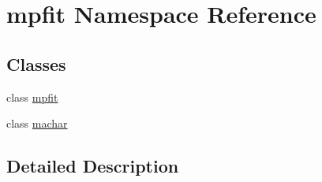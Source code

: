 \hypertarget{namespacempfit}{\section{mpfit Namespace Reference}
\label{namespacempfit}
}
\subsection*{Classes}
\begin{DoxyCompactItemize}
\item 
class \hyperlink{classmpfit_1_1mpfit}{mpfit}
\item 
class \hyperlink{classmpfit_1_1machar}{machar}
\end{DoxyCompactItemize}


\subsection{Detailed Description}

